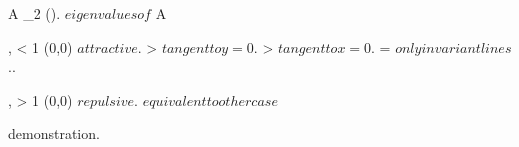 \documentclass[../Main/main]{subfiles}
\begin{document}
{	
	{
		{
			A \in \Mc_{2 }(\R).
			\lambda \neq \mu $ eigenvalues of $ A
		}
		\holds
		{
			\abs{ \lambda }, \abs{ \mu } < 1 \imp (0,0) $ attractive $.
			\abs{ \lambda } > \abs{ \mu } \imp $ tangent to y = 0$.
			\abs{ \mu } > \abs{ \lambda } \imp $ tangent to x = 0$.
			\abs{ \mu } = \abs{ \lambda } \imp $ only invariant lines $..

			\abs{ \lambda }, \abs{ \mu } > 1 \imp (0,0) $ repulsive $.
			$ equivalent to other case $
		}
		\demonstration
		{
			demonstration.
		}
	}
	
	
	
	
	
	
	
	
	
	
	
	
	
}
\end{document}
